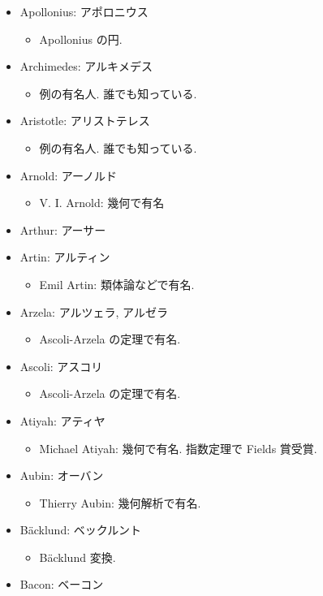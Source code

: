 \documentclass[openany, a4paper, oneside]{jsbook}
\begin{document}
\begin{itemize}
\item Apollonius: アポロニウス
\begin{itemize}
\item Apollonius の円.
\end{itemize}
\item Archimedes: アルキメデス
\begin{itemize}
\item 例の有名人. 誰でも知っている.
\end{itemize}
\item Aristotle: アリストテレス
\begin{itemize}
\item 例の有名人. 誰でも知っている.
\end{itemize}
\item Arnold: アーノルド
\begin{itemize}
\item V. I. Arnold: 幾何で有名
\end{itemize}
\item Arthur: アーサー
\item Artin: アルティン
\begin{itemize}
\item Emil Artin: 類体論などで有名.
\end{itemize}
\item Arzela: アルツェラ, アルゼラ
\begin{itemize}
\item Ascoli-Arzela の定理で有名.
\end{itemize}
\item Ascoli: アスコリ
\begin{itemize}
\item Ascoli-Arzela の定理で有名.
\end{itemize}
\item Atiyah: アティヤ
\begin{itemize}
\item Michael Atiyah: 幾何で有名. 指数定理で Fields 賞受賞.
\end{itemize}
\item Aubin: オーバン
\begin{itemize}
\item Thierry Aubin: 幾何解析で有名.
\end{itemize}
\item B\"acklund: ベックルント
\begin{itemize}
\item B\"acklund 変換.
\end{itemize}
\item Bacon: ベーコン

\end{itemize}
\end{document}
